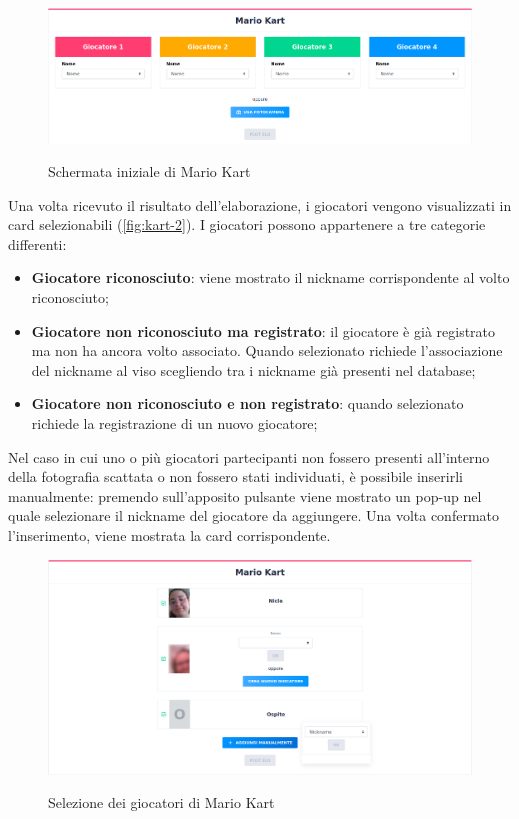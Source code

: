 		\begin{figure}[H]
			\centering
			\includegraphics[width=\textwidth]{immagini/kart-1.png} \\
			\caption{\label{fig:kart-1} Schermata iniziale di Mario Kart}
		\end{figure}
		
		\noindent Una volta ricevuto il risultato dell'elaborazione, i giocatori vengono visualizzati in card selezionabili (\autoref{fig:kart-2}). I giocatori possono appartenere a tre categorie differenti:
		\begin{itemize}
			\item \textbf{Giocatore riconosciuto}: viene mostrato il nickname corrispondente al volto riconosciuto;
			\item \textbf{Giocatore non riconosciuto ma registrato}: il giocatore è già registrato ma non ha ancora volto associato. Quando selezionato richiede l'associazione del nickname al viso scegliendo tra i nickname già presenti nel database; 
			\item\textbf{Giocatore non riconosciuto e non registrato}: quando selezionato richiede la registrazione di un nuovo giocatore; 
		\end{itemize} 
	
		\noindent Nel caso in cui uno o più giocatori partecipanti non fossero presenti all'interno della fotografia scattata o non fossero stati individuati, è possibile inserirli manualmente: premendo sull'apposito pulsante viene mostrato un pop-up nel quale selezionare il nickname del giocatore da aggiungere. Una volta confermato l'inserimento, viene mostrata la card corrispondente. \\
		
		\begin{figure}[H]
			\centering
			\includegraphics[width=\textwidth]{immagini/kart-2.png} \\
			\caption{\label{fig:kart-2} Selezione dei giocatori di Mario Kart}
		\end{figure}
	
		
